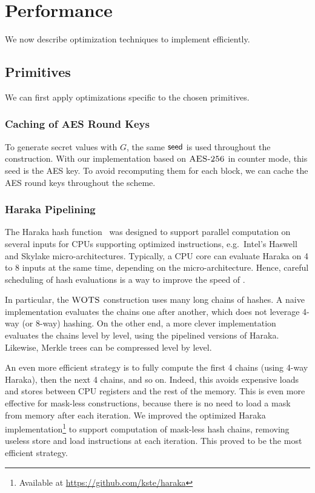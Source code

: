 \chapter{Performance}\label{chap:performance}

We now describe optimization techniques to implement \gravity{} efficiently.

\section{Primitives}

We can first apply optimizations specific to the chosen primitives.

\subsection{Caching of AES Round Keys}

To generate secret values with $G$, the same $\textsf{seed}$ is used throughout the construction.
With our implementation based on $\textsc{AES-256}$ in counter mode, this seed is the AES key.
To avoid recomputing them for each block, we can cache the AES round keys throughout the scheme.

\subsection{Haraka Pipelining}

The Haraka hash function~\cite{haraka} was designed to support parallel computation on several inputs for CPUs supporting optimized instructions, e.g.\ Intel's Haswell and Skylake micro-architectures.
Typically, a CPU core can evaluate Haraka on 4 to 8 inputs at the same time, depending on the micro-architecture.
Hence, careful scheduling of hash evaluations is a way to improve the speed of \gravity{}.

In particular, the $\textsc{WOTS}$ construction uses many long chains of hashes.
A naive implementation evaluates the chains one after another, which does not leverage 4-way (or 8-way) hashing.
On the other end, a more clever implementation evaluates the chains level by level, using the pipelined versions of Haraka.
Likewise, Merkle trees can be compressed level by level.

An even more efficient strategy is to fully compute the first 4 chains (using 4-way Haraka), then the next 4 chains, and so on.
Indeed, this avoids expensive loads and stores between CPU registers and the rest of the memory.
This is even more effective for mask-less constructions, because there is no need to load a mask from memory after each iteration.
We improved the optimized Haraka implementation\footnote{Available at \url{https://github.com/kste/haraka}} to support computation of mask-less hash chains, removing useless store and load instructions at each iteration.
This proved to be the most efficient strategy.

